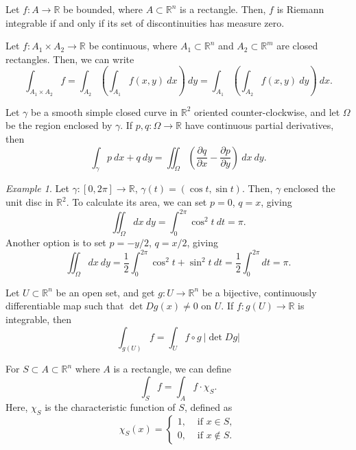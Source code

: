 \documentclass[11pt]{article}
\newcommand{\R}{\mathbb{R}}
\newcommand{\pp}[2]{\frac{\partial #1}{\partial #2}}
\theoremstyle{definition}
\theoremstyle{remark}
\newtheorem*{example}{Example}
\numberwithin{equation}{section}
\begin{document}
    \begin{theorem}
        Let $f\colon A \to \R$ be bounded, where $A \subset \R^n$ is a rectangle.
        Then, $f$ is Riemann integrable if and only if its set of discontinuities has
        measure zero.
    \end{theorem}


    \begin{theorem}
        Let $f\colon A_1 \times A_2 \to \R$ be continuous, where $A_1 \subset \R^n$
        and $A_2 \subset \R^m$ are closed rectangles. Then, we can write \[
            \int_{A_1 \times A_2} f = \int_{A_2} \left( \int_{A_1} f(x,
            y)\:dx\right)\:dy = \int_{A_1} \left( \int_{A_2} f(x, y)\:dy\right)\:dx.
        \] 
    \end{theorem}
    
    \begin{theorem}
        Let $\gamma$ be a smooth simple closed curve in $\R^2$ oriented
        counter-clockwise, and let $\Omega$ be the region enclosed by $\gamma$. If
        $p, q \colon \Omega \to \R$ have continuous partial derivatives, then \[
            \int_\gamma p\:dx + q\:dy = \iint_\Omega \left(\pp{q}{x} -
            \pp{p}{y}\right) \:dx\:dy.
        \] 
    \end{theorem}
    \begin{example}
        Let $\gamma \colon [0, 2\pi] \to \R$, $\gamma(t) = (\cos{t}, \sin{t})$. Then,
        $\gamma$ enclosed the unit disc in $\R^2$. To calculate its area, we can set
        $p = 0$, $q = x$, giving \[
            \iint_{\Omega} dx\:dy = \int_0^{2\pi} \cos^2{t}\:dt = \pi.
        \] Another option is to set $p = -y / 2$, $q = x / 2$, giving \[
            \iint_{\Omega} dx\:dy = \frac{1}{2}\int_0^{2\pi} \cos^2{t}+
            \sin^2{t}\:dt = \frac{1}{2}\int_0^{2\pi} dt = \pi.
        \] 
    \end{example}


    \begin{theorem}
        Let $U \subset \R^n$ be an open set, and get $g\colon U \to \R^n$ be a
        bijective, continuously differentiable map such that $\det{Dg(x)} \neq 0$ on
        $U$. If $f\colon g(U) \to \R$ is integrable, then \[
            \int_{g(U)} f = \int_U f\circ g\:|\det{Dg}|
        \] 
    \end{theorem}


    \begin{definition}
        For $S \subset A \subset \R^n$ where $A$ is a rectangle, we can define \[
            \int_S f = \int_A f\cdot \chi_S.
        \] Here, $\chi_S$ is the characteristic function of $S$, defined as \[
            \chi_S(x) = \begin{cases}
                1, &\text{ if } x \in S, \\
                0, &\text{ if } x \notin S.
            \end{cases}
        \] 
    \end{definition}
\end{document}
